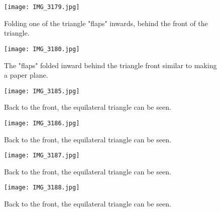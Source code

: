 \documentclass{article}
\begin{document}
\begin{figure}[h]
    \centering
    \texttt{[image: IMG\_3179.jpg]}
    \caption{Folding one of the triangle "flaps" inwards, behind the front of the triangle. }
    \label{fig:my_label}
\end{figure}

\begin{figure}[h]
    \centering
    \texttt{[image: IMG\_3180.jpg]}
    \caption{The "flaps" folded inward behind the triangle front similar to making a paper plane. }
    \label{fig:my_label}
\end{figure}

\begin{figure}[h]
    \centering
    \texttt{[image: IMG\_3185.jpg]}
    \caption{Back to the front, the equilateral triangle can be seen.}
    \label{fig:my_label}
\end{figure}

\begin{figure}[h]
    \centering
    \texttt{[image: IMG\_3186.jpg]}
    \caption{Back to the front, the equilateral triangle can be seen.}
    \label{fig:my_label}
\end{figure}

\begin{figure}[h]
    \centering
    \texttt{[image: IMG\_3187.jpg]}
    \caption{Back to the front, the equilateral triangle can be seen.}
    \label{fig:my_label}
\end{figure}

\begin{figure}[h]
    \centering
    \texttt{[image: IMG\_3188.jpg]}
    \caption{Back to the front, the equilateral triangle can be seen.}
    \label{fig:my_label}
\end{figure}
\end{document}
